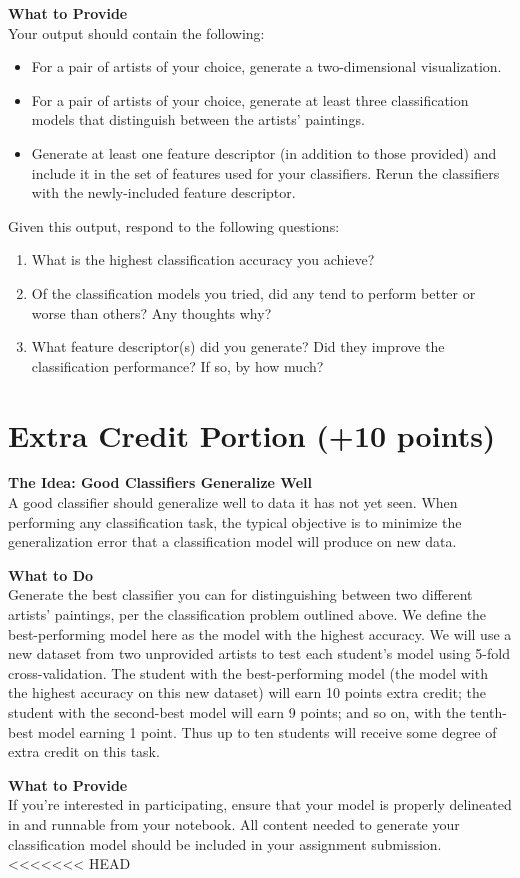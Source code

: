 \documentclass[paper=a4, fontsize=11pt]{scrartcl} %
\numberwithin{equation}{section} %
\numberwithin{figure}{section} %
\numberwithin{table}{section} %
\begin{document}
\textbf{What to Provide}\\
Your output should contain the following:
\begin{itemize}
\item For a pair of artists of your choice, generate a two-dimensional visualization.
\item For a pair of artists of your choice, generate at least three classification models that distinguish between the artists' paintings.
\item Generate at least one feature descriptor (in addition to those provided) and include it in the set of features used for your classifiers. Rerun the classifiers with the newly-included feature descriptor.
\end{itemize}
Given this output, respond to the following questions:
\begin{enumerate}
\item What is the highest classification accuracy you achieve?
\item Of the classification models you tried, did any tend to perform better or worse than others? Any thoughts why?
\item What feature descriptor(s) did you generate? Did they improve the classification performance? If so, by how much?
\end{enumerate}

\vspace{8pt}

\section{Extra Credit Portion (+10 points)}
\textbf{The Idea:  Good Classifiers Generalize Well}\\
A good classifier should generalize well to data it has not yet seen. When performing any classification task, the typical objective is to minimize the generalization error that a classification model will produce on new data.

\vspace{8pt}

\textbf{What to Do}\\
Generate the best classifier you can for distinguishing between two different artists' paintings, per the classification problem outlined above. We define the best-performing model here as the model with the highest accuracy. We will use a new dataset from two unprovided artists to test each student's model using 5-fold cross-validation. The student with the best-performing model (the model with the highest accuracy on this new dataset) will earn 10 points extra credit; the student with the second-best model will earn 9 points; and so on, with the tenth-best model earning 1 point. Thus up to ten students will receive some degree of extra credit on this task.

\vspace{8pt}

\textbf{What to Provide}\\
If you're interested in participating, ensure that your model is properly delineated in and runnable from your notebook. All content needed to generate your classification model should be included in your assignment submission.
<<<<<<< HEAD
\end{document}
